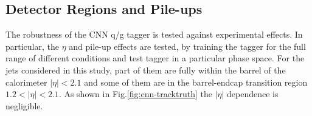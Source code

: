 

\subsection{Detector Regions and Pile-ups}
\label{sec:cnn-detectorregion}

The robustness of the CNN q/g tagger is tested against experimental effects. In particular, the $\eta$ and pile-up effects are tested,
by training the tagger for the full range of different conditions and test tagger in a particular phase space.
For the jets considered in this study, part of them are fully within the barrel of the calorimeter $|\eta|<2.1$ and some of them
are in the barrel-endcap transition region $1.2<|\eta|<2.1$. As shown in Fig.\ref{fig:cnn-tracktruth} the $|\eta|$ dependence is negligible. 


